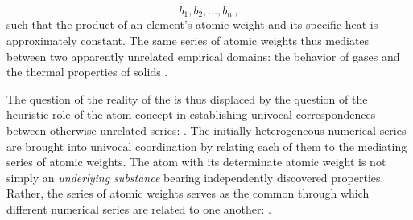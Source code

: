 \documentclass[submitted,12pt]{article}
\providecommand{\DIFaddbegin}{} %
\providecommand{\DIFaddend}{} %
\providecommand{\DIFdelbegin}{} %
\providecommand{\DIFdelend}{} %
\begin{document}
\begin{equation*}
b_1, b_2, \ldots, b_n\,,
\end{equation*}
%
such that the product of an element's atomic weight and its specific heat is approximately constant. The same series of atomic weights thus mediates between two apparently unrelated empirical domains: the behavior of gases and the thermal properties of solids .

The question of the reality of the  is thus displaced by the question of the heuristic role of the atom-concept in establishing univocal correspondences between otherwise unrelated series: \DIFdelbegin %
\DIFdelend \DIFaddbegin {} \DIFaddend {}. The initially heterogeneous numerical series are brought into univocal coordination  by relating each of them to the mediating series of atomic weights. The atom with its determinate atomic weight is not simply an \emph{underlying substance} bearing independently discovered properties. Rather, the series of atomic weights serves as the common  through which different numerical series are related to one another: \DIFdelbegin %
\DIFdelend \DIFaddbegin {} \DIFaddend {}.
\end{document}
